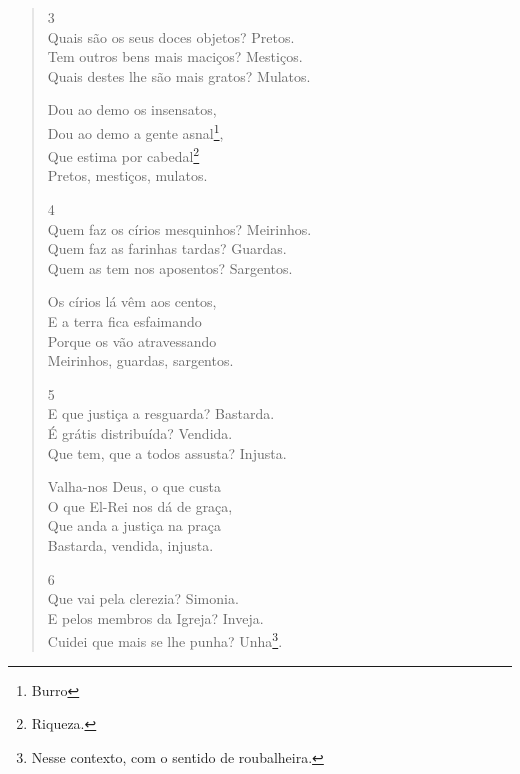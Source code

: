 \begin{verse}
3 \\
Quais são os seus doces objetos? \dotfill Pretos. \\
Tem outros bens mais maciços? \dotfill Mestiços. \\
Quais destes lhe são mais gratos? \dotfill Mulatos.
			
\hspace{5em} Dou ao demo os insensatos, \\
\hspace{5em} Dou ao demo a gente asnal\footnote{Burro}, \\
\hspace{5em} Que estima por cabedal\footnote{Riqueza.} \\
\hspace{5em} Pretos, mestiços, mulatos.
			
4 \\
Quem faz os círios mesquinhos? \dotfill Meirinhos. \\
Quem faz as farinhas tardas? \dotfill Guardas. \\
Quem as tem nos aposentos? \dotfill Sargentos.
			
\hspace{5em} Os círios lá vêm aos centos, \\
\hspace{5em} E a terra fica esfaimando \\
\hspace{5em} Porque os vão atravessando \\
\hspace{5em} Meirinhos, guardas, sargentos.
			
5 \\
E que justiça a resguarda?  \dotfill Bastarda. \\
É grátis distribuída? \dotfill Vendida. \\
Que tem, que a todos assusta? \dotfill Injusta. 
			
\hspace{5em} Valha-nos Deus, o que custa \\
\hspace{5em} O que El-Rei nos dá de graça, \\
\hspace{5em} Que anda a justiça na praça \\
\hspace{5em} Bastarda, vendida, injusta. 
			
6 \\
Que vai pela clerezia? \dotfill Simonia. \\
E pelos membros da Igreja? \dotfill Inveja. \\
Cuidei que mais se lhe punha? \dotfill Unha\footnote{Nesse contexto, com o sentido de roubalheira.}.
			

\end{verse}
